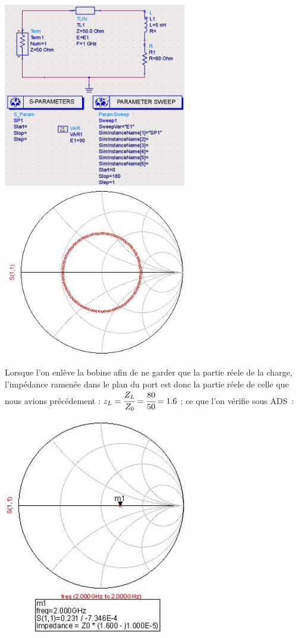 \documentclass[10pt]{article}
\begin{document}
   \includegraphics[width=8cm]{I2_d_circuit.jpg}
   \includegraphics[width=8cm]{I2_d_simulation.jpg}

   Lorsque l’on enlève la bobine afin de ne garder que la partie réele de la charge, l’impédance ramenée dans le plan du port est donc la partie réele de celle que nous avions précédement : $z_L=\cfrac{Z_L}{Z_0}=\cfrac{80}{50} = 1.6$ ; ce que l’on vérifie sous ADS :

   \includegraphics[width=8cm]{I2_e_impedance.jpg}
\end{document}

